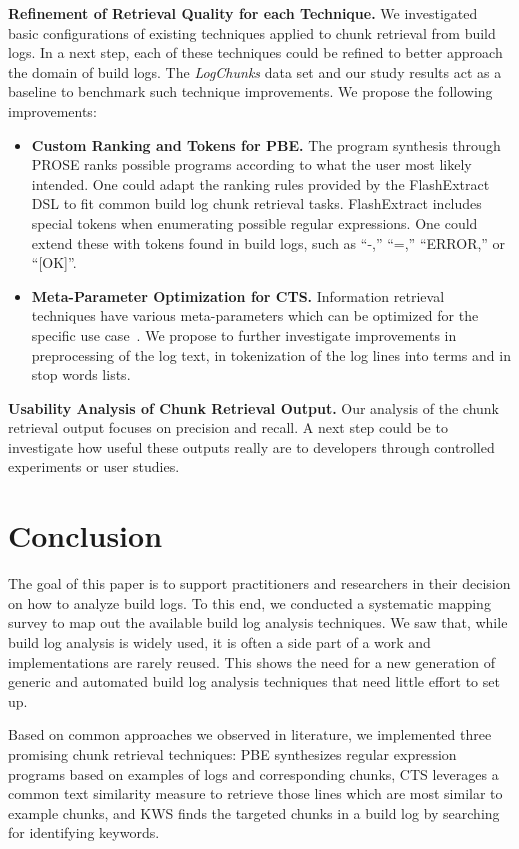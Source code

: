 \textbf{Refinement of Retrieval Quality for each Technique.} We
investigated basic configurations of existing techniques applied to
chunk retrieval from build logs.
In a next step, each of these
techniques could be refined to better approach the domain of build
logs.
The \emph{LogChunks} data set and our study results act as a
baseline to benchmark such technique improvements.
We propose the
following improvements:
\begin{itemize}[leftmargin=0.4cm]
  \item \textbf{Custom Ranking and Tokens for PBE.} The program
  synthesis through PROSE ranks possible programs according to
  what the user most likely intended.
  One could adapt the ranking
  rules provided by the FlashExtract DSL to fit common build log
  chunk retrieval tasks.
  FlashExtract includes special tokens when
  enumerating possible regular expressions.
  One could extend these
  with tokens found in build logs, such as ``-,''
	``=,'' ``ERROR,''
  or ``[OK]''.
  \item \textbf{Meta-Parameter Optimization for CTS.} Information
  retrieval techniques have various meta-parameters which can be
  optimized for the specific use
  case~\cite{panichella2016parameterizing}.
  We propose to further
  investigate improvements in preprocessing of the log text, in
  tokenization of the log lines into terms and in stop words
  lists.
\end{itemize}

\textbf{Usability Analysis of Chunk Retrieval Output.}
Our
analysis of the chunk retrieval output focuses on
precision and recall.
A next step could be to investigate how useful these
outputs really are to developers through controlled experiments or
user studies.

\section{Conclusion}
\label{sec:conclusion-fw}

The goal of this paper is to support practitioners and researchers in
their decision on how to analyze build logs.
To this end, we
conducted a systematic mapping survey to map out the available build
log analysis techniques.
We saw that, while build log analysis is widely used, it is often
a side part of a work and implementations are rarely reused.
This shows the need for a new generation of generic and automated
build log analysis techniques that need little effort to set up.

Based on common approaches we observed in literature,
we implemented three promising chunk retrieval techniques:
PBE synthesizes regular expression programs based on examples of logs
and corresponding chunks, CTS leverages a common text similarity
measure to retrieve those lines which are most similar to example
chunks, and KWS finds the targeted chunks in a build log by searching
for identifying keywords.

